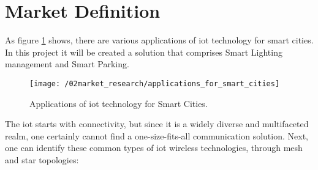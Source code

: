 \section{Market Definition}
%
%
%

As figure \ref{fig:smart_cities_sols} shows, there are various applications of \ac{iot} technology for smart cities. In this project it will be created a solution that comprises Smart Lighting management and Smart Parking.

\begin{figure}[ht]
	\centering
	\texttt{[image: /02market\_research/applications\_for\_smart\_cities]}
	\caption{Applications of \ac{iot} technology for Smart Cities. \cite{smart_cities_solutions}}
	\label{fig:smart_cities_sols}
\end{figure}

The \ac{iot} starts with connectivity, but since it is a widely diverse and multifaceted realm, one certainly cannot find a one-size-fits-all communication solution. Next, one can identify these common types of \ac{iot} wireless technologies, through mesh and star topologies:

